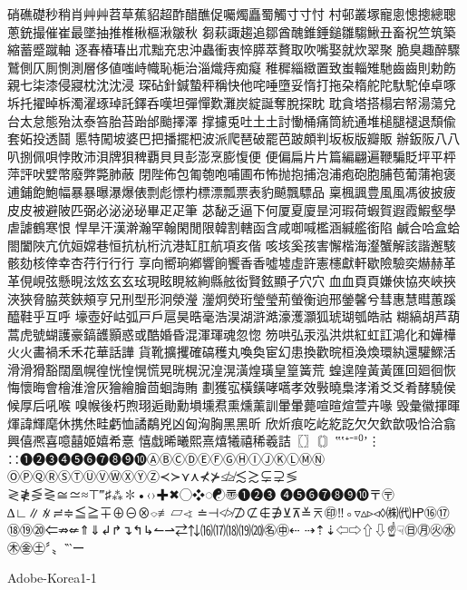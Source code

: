硝礁礎秒稍肖⾋艸苕草蕉貂超酢醋醮促囑燭矗蜀觸⼨寸忖
村邨叢塚寵悤憁摠總聰蔥銃撮催崔最墜抽推椎楸樞湫皺秋
芻萩諏趨追鄒酋醜錐錘鎚雛騶鰍丑畜祝竺筑築縮蓄蹙蹴軸
逐春椿瑃出朮黜充忠沖蟲衝衷悴膵萃贅取吹嘴娶就炊翠聚
脆臭趣醉驟鷲側仄厠惻測層侈値嗤峙幟恥梔治淄熾痔痴癡
稚穉緇緻置致蚩輜雉馳⿒齒則勅飭親七柒漆侵寢枕沈沈浸
琛砧針鍼蟄秤稱快他咤唾墮妥惰打拖朶楕舵陀馱駝倬卓啄
坼托擢晫柝濁濯琢琸託鐸呑嘆坦彈憚歎灘炭綻誕奪脫探眈
耽貪塔搭榻宕帑湯蕩兌台太怠態殆汰泰笞胎苔跆邰颱擇澤
撑攄兎吐⼟土討慟桶痛筒統通堆槌腿褪退頹偸套妬投透鬪
慝特闖坡婆巴把播擺杷波派爬琶破罷芭跛頗判坂板版瓣販
辦鈑阪⼋八叭捌佩唄悖敗沛浿牌狽稗覇⾙貝彭澎烹膨愎便
便偏扁⽚片篇編翩遍鞭騙貶坪平枰萍評吠嬖幣廢弊斃肺蔽
閉陛佈包匍匏咆哺圃布怖抛抱捕泡浦疱砲胞脯苞葡蒲袍褒
逋鋪飽鮑幅暴暴曝瀑爆俵剽彪慓杓標漂瓢票表豹飇飄驃品
稟楓諷豊⾵風馮彼披疲⽪皮被避陂匹弼必泌泌珌畢⽦疋筆
苾馝乏逼下何厦夏廈昰河瑕荷蝦賀遐霞鰕壑學虐謔鶴寒恨
悍旱汗漢澣瀚罕翰閑閒限韓割轄函含咸啣喊檻涵緘艦銜陷
鹹合哈盒蛤閤闔陜亢伉姮嫦巷恒抗杭桁沆港缸肛航項亥偕
咳垓奚孩害懈楷海瀣蟹解該諧邂駭骸劾核倖幸杏荇⾏行行
享向嚮珦鄕響餉饗⾹香噓墟虛許憲櫶獻軒歇險驗奕爀赫⾰
革俔峴弦懸晛泫炫⽞玄玹現眩睍絃絢縣舷衒賢鉉顯孑⽳穴
⾎血⾴頁嫌俠協夾峽挾浹狹脅脇莢鋏頰亨兄刑型形泂滎瀅
灐炯熒珩瑩瑩荊螢衡逈邢鎣馨兮彗惠慧暳蕙蹊醯鞋乎互呼
壕壺好岵弧⼾戶扈昊晧毫浩淏湖滸澔濠濩灝狐琥瑚瓠皓祜
糊縞胡芦葫蒿虎號蝴護豪鎬頀顥惑或酷婚昏混渾琿魂忽惚
笏哄弘汞泓洪烘紅虹訌鴻化和嬅樺⽕火畵禍⽲禾花華話譁
貨靴擴攫確碻穫丸喚奐宦幻患換歡晥桓渙煥環紈還驩鰥活
滑滑猾豁闊凰幌徨恍惶愰慌晃晄榥況湟滉潢煌璜皇篁簧荒
蝗遑隍⿈黃匯回廻徊恢悔懷晦會檜淮澮灰獪繪膾茴蛔誨賄
劃獲宖橫鐄哮嚆孝效斅曉梟涍淆⽘爻肴酵驍侯候厚后吼喉
嗅帿後朽煦珝逅勛勳塤壎焄熏燻薰訓暈暈薨喧暄煊萱卉喙
毁彙徽揮暉煇諱輝麾休携烋畦虧恤譎鷸兇凶匈洶胸⿊黑昕
欣炘痕吃屹紇訖⽋欠欽歆吸恰洽翕興僖凞喜噫囍姬嬉希憙
憘戱晞曦熙熹熺犧禧稀羲詰〖〗〘〙‟‛⁺⁻⁼⁽⁾ʼ⋮
∷➊➋➌➍➎➏➐➑➒➓ⒶⒷⒸⒹⒺⒻⒼⒽⒾⒿⓀⓁⓂⓃ
ⓄⓅⓆⓇⓈⓉⓊⓋⓌⓍⓎⓏ≺≻⋎⋏⊀⊁≰≱≲≳⊊⊋≶
≷≹⋚⋛≅≃≈⊤‴♯⁂✽•‹›✚✖◯❖◌☯〠❶❷❸
❹❺❻❼❽❾❿〒〶∆∟∥∦≓≑≦≧∓⊕⊖⊗⌔≢▱∢
≐⊣≮≯⊅⊄∉∌⊻⊼≚⌆㊞‼◦▿▵▹◃◊㈱㈹㏋⑯⑰
⑱⑲⑳⇐⇏⇍⇑⇓↲↱↴↰↳↼⇀⇄⇅⒃⒄⒅⒆⒇㊔㊥⇠
⇢⇡⇣⇦⇨⇧⇩☝☟㊐㊊㊋㊌㊍㊎㊏〞〟‶‵ー

Adobe-Korea1-1

